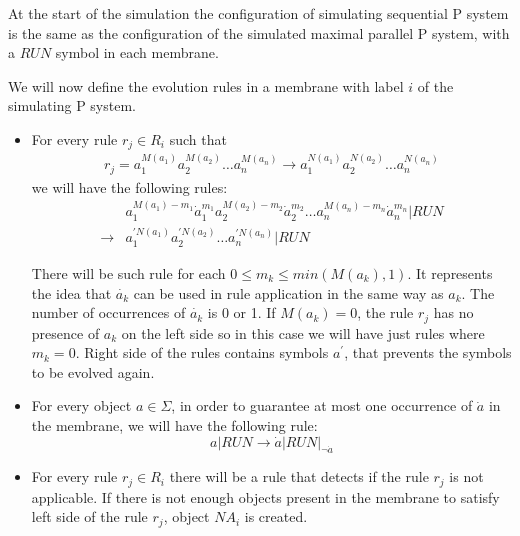 \begin{dokaz}
  At the start of the simulation the configuration of simulating sequential P system is the same as the configuration of the simulated maximal parallel P system, with a $\mathit{RUN}$ symbol in each membrane.


  We will now define the evolution rules in a membrane with label $i$ of the simulating P system.

  \begin{itemize}
    \item For every rule $r_j\in R_i$ such that
      \begin{align*}
        r_j = a_1^{M(a_1)}a_2^{M(a_2)}\dots a_n^{M(a_n)} \rightarrow a_1^{N(a_1)}a_2^{N(a_2)}\dots a_n^{N(a_n)}
      \end{align*}
      we will have the following rules:
      \begin{align*}
        &a_1^{M(a_1)-m_1}\dot{a}_1^{m_1}
        a_2^{M(a_2)-m_2}\dot{a}_2^{m_2}\dots
        a_n^{M(a_n)-m_n}\dot{a}_n^{m_n}|\mathit{RUN} \\
        \rightarrow &a_1^{\prime N(a_1)}a_2^{\prime N(a_2)}\dots a_n^{\prime N(a_n)}|\mathit{RUN}
      \end{align*}
      
      There will be such rule for each $0\leq m_k\leq min(M(a_k),1)$. It represents the idea that $\dot{a_k}$ can be used in rule application in the same way as $a_k$. The number of occurrences of $\dot{a_k}$ is 0 or 1. If $M(a_k) = 0$, the rule $r_j$ has no presence of $a_k$ on the left side so in this case we will have just rules where $m_k=0$. Right side of the rules contains symbols $a^\prime$, that prevents the symbols to be evolved again.

    \item For every object $a\in\Sigma$, in order to guarantee at most one occurrence of $\dot{a}$ in the membrane, we will have the following rule:
    $$a|\mathit{RUN} \rightarrow \dot{a}|\mathit{RUN}|_{\neg \dot{a}}$$

    \item For every rule $r_j\in R_i$ there will be a rule that detects if the rule $r_j$ is not applicable. If there is not enough objects present in the membrane to satisfy left side of the rule $r_j$, object $\mathit{NA_i}$ is created.


\end{itemize}
\end{dokaz}
